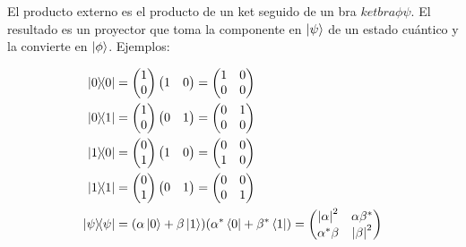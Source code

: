 El producto externo es el producto de un ket seguido de un bra $ketbra{\phi}{\psi}$. El resultado es un proyector que toma la componente en $\ket{\psi}$ de un estado cuántico y la convierte en $\ket{\phi}$. Ejemplos:

\begin{align*}
    \ketbra{0}{0} &= \begin{pmatrix} 1 \\ 0 \end{pmatrix} \begin{pmatrix} 1 & 0 \end{pmatrix} = \begin{pmatrix} 1 & 0 \\ 0 & 0 \end{pmatrix} \\
    \ketbra{0}{1} &= \begin{pmatrix} 1 \\ 0 \end{pmatrix} \begin{pmatrix} 0 & 1 \end{pmatrix} = \begin{pmatrix} 0 & 1 \\ 0 & 0 \end{pmatrix} \\
    \ketbra{1}{0} &= \begin{pmatrix} 0 \\ 1 \end{pmatrix} \begin{pmatrix} 1 & 0 \end{pmatrix} = \begin{pmatrix} 0 & 0 \\ 1 & 0 \end{pmatrix} \\
    \ketbra{1}{1} &= \begin{pmatrix} 0 \\ 1 \end{pmatrix} \begin{pmatrix} 0 & 1 \end{pmatrix} = \begin{pmatrix} 0 & 0 \\ 0 & 1 \end{pmatrix} \\
    \ketbra{\psi}{\psi} &= (\alpha \ket{0} + \beta \ket{1})(\alpha^* \bra{0} + \beta^* \bra{1}) = \begin{pmatrix} \abs{\alpha}^2 & \alpha \beta^* \\ \alpha^* \beta & \abs{\beta}^2 \end{pmatrix}
\end{align*}

